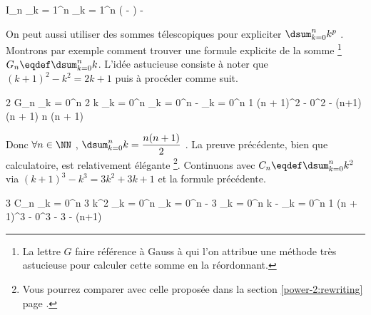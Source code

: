 \medskip

\begin{explain}[style = sar]
	I_n \explnext[\eqdef]{}
	\dsum_{k = 1}^{n} 
		\explnext{}
	\dsum_{k = 1}^{n} \left(  -  \right)
	 - 
		\explnext{}
\end{explain}


\bigskip

On peut aussi utiliser des sommes télescopiques pour expliciter $\dsum_{k = 0}^{n} k^p$ .
Montrons par exemple comment trouver une formule explicite de la somme
\footnote{
	La lettre $G$ faire référence à Gauss à qui l'on attribue une méthode très astucieuse pour calculer cette somme en la réordonnant.
}
$G_n \eqdef \dsum_{k = 0}^{n} k$.
L'idée astucieuse consiste à noter que $(k+1)^2 - k^2 = 2 k + 1$ puis à procéder comme suit.

\medskip

\begin{explain}[style = sar]
	2 G_n
		\explnext{}
	\dsum_{k = 0}^{n} 2 k
		\explnext{}
	\dsum_{k = 0}^{n} \big[ \, (k+1)^2 - k^2 - 1 \, \big]
		\explnext{}
	\dsum_{k = 0}^{n} \big[ \, (k+1)^2 - k^2 \, \big] - \dsum_{k = 0}^{n} 1
	(n + 1)^2 - 0^2 - (n+1)
		\explnext{}
	(n + 1) \cdot \big[ \, (n + 1) - 1 \, \big]
		\explnext{}
	n (n + 1)
\end{explain}

\bigskip

Donc
$\forall n \in \NN$ , $\dsum_{k = 0}^{n} k = \dfrac{n(n + 1)}{2}$ .
La preuve précédente, bien que calculatoire, est relativement élégante
\footnote{
	Vous pourrez comparer avec celle proposée dans la section \ref{power-2:rewriting} page \pageref{power-2:rewriting}.
}.
Continuons avec $C_n \eqdef \dsum_{k = 0}^{n} k^2$
via $(k+1)^3 - k^3 = 3 k^2 + 3 k + 1$
et la formule précédente.

\medskip

\begin{explain}[style = sar]
	3 C_n
		\explnext{}
	\dsum_{k = 0}^{n} 3 k^2
		\explnext{}
	\dsum_{k = 0}^{n} \big[ \, (k+1)^3 - k^3 - 3 k - 1 \, \big]
		\explnext{}
	\dsum_{k = 0}^{n} \big[ \, (k+1)^3 - k^3 \, \big] - 3 \dsum_{k = 0}^{n} k - \dsum_{k = 0}^{n} 1
	(n + 1)^3 - 0^3 - 3 \cdot {} - (n+1)
		\explnext{}
	 \cdot \big[ \, 2 (n + 1)^2 - 3n - 2 \, \big]
		\explnext{}
	 \cdot \big[ \, 2 (n^2 + 2 n + 1) - 3n - 2 \, \big]
		\explnext{}
		\explnext{}
\end{explain}


